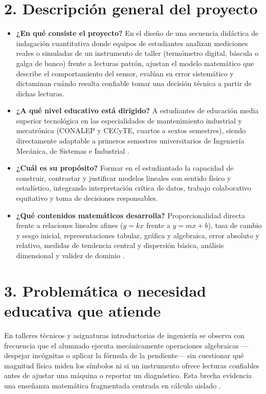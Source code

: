 \documentclass[spanish,letterpaper,oneside]{article}
\begin{document}
\section{2. Descripción general del proyecto}
\begin{itemize}
  \item \textbf{¿En qué consiste el proyecto?} En el diseño de una secuencia didáctica de indagación cuantitativa donde equipos de estudiantes analizan mediciones reales o simuladas de un instrumento de taller (termómetro digital, báscula o galga de banco) frente a lecturas patrón, ajustan el modelo matemático que describe el comportamiento del sensor, evalúan su error sistemático y dictaminan cuándo resulta confiable tomar una decisión técnica a partir de dichas lecturas.
  \item \textbf{¿A qué nivel educativo está dirigido?} A estudiantes de educación media superior tecnológica en las especialidades de mantenimiento industrial y mecatrónica (CONALEP y CECyTE, cuartos a sextos semestres), siendo directamente adaptable a primeros semestres universitarios de Ingeniería Mecánica, de Sistemas e Industrial \citep{conalep2025mecatronica}.
  \item \textbf{¿Cuál es su propósito?} Formar en el estudiantado la capacidad de construir, contrastar y justificar modelos lineales con sentido físico y estadístico, integrando interpretación crítica de datos, trabajo colaborativo equitativo y toma de decisiones responsables.
  \item \textbf{¿Qué contenidos matemáticos desarrolla?} Proporcionalidad directa frente a relaciones lineales afines ($y = kx$ frente a $y = mx + b$), tasa de cambio y sesgo inicial, representaciones tabular, gráfica y algebraica, error absoluto y relativo, medidas de tendencia central y dispersión básica, análisis dimensional y validez de dominio \citep{sep2023pensamiento,star2015algebra}.
\end{itemize}

\section{3. Problemática o necesidad educativa que atiende}
En talleres técnicos y asignaturas introductorias de ingeniería se observa con frecuencia que el alumnado ejecuta mecánicamente operaciones algebraicas —despejar incógnitas o aplicar la fórmula de la pendiente— sin cuestionar qué magnitud física miden los símbolos ni si un instrumento ofrece lecturas confiables antes de ajustar una máquina o reportar un diagnóstico. Esta brecha evidencia una enseñanza matemática fragmentada centrada en cálculo aislado \citep{sawyer2008optimizing}.
\end{document}
